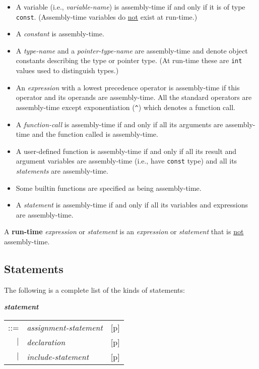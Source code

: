 \documentclass[12pt]{article}
\newcommand{\key}[1]{{\rm \bfseries #1}}
\newcommand{\emkey}[1]{{\em \bfseries #1}}
\newcommand{\pagref}[1]{p\pageref{#1}}
\newenvironment{indpar}[1][0.3in]%
	{\begin{list}{}%
		     {\setlength{\itemsep}{0in}%
		      \setlength{\topsep}{0in}%
		      \setlength{\parsep}{1ex}%
		      \setlength{\labelwidth}{#1}%
		      \setlength{\leftmargin}{#1}%
		      \addtolength{\leftmargin}{\labelsep}}%
	 \item}%
	{\end{list}}
\begin{document}
\begin{itemize}
\item A variable (i.e., {\em variable-name})
is assembly-time if and only if it is of type {\tt const}.
(Assembly-time variables do \underline{not} exist at run-time.)
\item A {\em constant} is assembly-time.
\item A {\em type-name} and a {\em pointer-type-name} are assembly-time
and denote object constants describing the type or pointer type.
(At run-time these are {\tt int} values used to distinguish types.)
\item An {\em expression} with a lowest precedence operator is
      assembly-time if this operator and its operands are assembly-time.
      All the standard operators are assembly-time except exponentiation
      ({\tt \textasciicircum}) which denotes a function call.
\item A {\em function-call} is assembly-time if and only if all its
      arguments are assembly-time and the function called is
      assembly-time.
\item A user-defined function is assembly-time if and only if all its
      result and argument variables are assembly-time (i.e., have
      {\tt const} type) and all its
      {\em statements} are assembly-time.
\item Some builtin functions are specified as being assembly-time.
\item A {\em statement} is assembly-time if and only if all its
      variables and expressions are assem\-bly-time.
\end{itemize}

A \key{run-time} {\em expression} or {\em statement}
is an {\em expression} or {\em statement} that is
\underline{not} assembly-time.

\subsection{Statements}
\label{STATEMENTS}

The following is a complete list of the kinds of statements:
\begin{indpar}
\emkey{statement}\label{STATEMENT}
    \begin{tabular}[t]{@{}rll}
    ::= & {\em assignment-statement}
        & [\pagref{ASSIGNMENT-STATEMENTS}] \\
    $|$ & {\em declaration}
        & [\pagref{DECLARATIONS}] \\
    $|$ & {\em include-statement}
        & [\pagref{INCLUDE-STATEMENTS}] \\
    \end{tabular}
\end{indpar}
\end{document}
